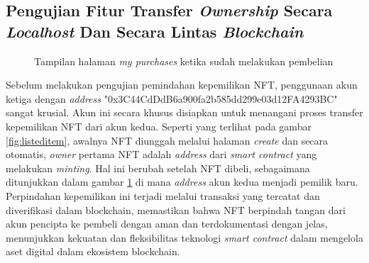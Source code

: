 \newpage
\subsection{Pengujian Fitur Transfer \emph{Ownership} Secara \emph{Localhost} Dan Secara Lintas \emph{Blockchain}}

\begin{figure} [H] \centering
  \caption{Tampilan halaman \emph{my purchases} ketika sudah melakukan pembelian}
  \label{fig:address_nft_b_1}
  \end{figure}

Sebelum melakukan pengujian pemindahan kepemilikan NFT, penggunaan akun ketiga dengan \emph{address} "0x3C44CdDdB6a900fa2b585dd299e03d12FA4293BC" sangat krusial. Akun ini secara khusus disiapkan untuk menangani proses transfer kepemilikan NFT dari akun kedua. Seperti yang terlihat pada gambar \ref*{fig:listeditem}, awalnya NFT diunggah melalui halaman \emph{create} dan secara otomatis, \emph{owner} pertama NFT adalah \emph{address} dari \emph{smart contract} yang melakukan \emph{minting}. Hal ini berubah setelah NFT dibeli, sebagaimana ditunjukkan dalam gambar \ref{fig:address_nft_b_1} di mana \emph{address} akun kedua menjadi pemilik baru. Perpindahan kepemilikan ini terjadi melalui transaksi yang tercatat dan diverifikasi dalam blockchain, memastikan bahwa NFT berpindah tangan dari akun pencipta ke pembeli dengan aman dan terdokumentasi dengan jelas, menunjukkan kekuatan dan fleksibilitas teknologi \emph{smart contract} dalam mengelola aset digital dalam ekosistem blockchain.

